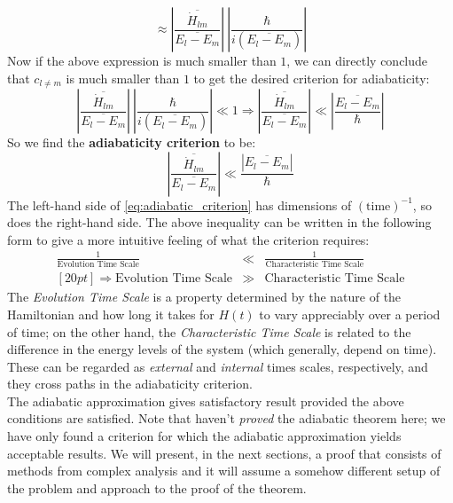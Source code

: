 \documentclass[12pt,a4paper]{article}
\begin{document}
	\begin{equation}
		\approx \left| \dfrac{\overline{\dot{H}_{lm}}}{\overline{E_{l} - E_{m}}} \right|\ \left| \frac{\hbar}{i \left( \overline{E_{l} - E_{m}} \right)} \right|
		\label{eq:final_bound}
	\end{equation}
	Now if the above expression is much smaller than $1$, we can directly conclude that $c_{l \neq m}$ is much smaller than $1$ to get the desired criterion for adiabaticity:
	\begin{equation}
		\left| \dfrac{\overline{\dot{H}_{lm}}}{\overline{E_{l} - E_{m}}} \right|\ \left| \frac{\hbar}{i \left( \overline{E_{l} - E_{m}} \right)} \right| \ll 1 \Rightarrow \left| \dfrac{\overline{\dot{H}_{lm}}}{\overline{E_{l} - E_{m}}} \right| \ll \left| \frac{ \overline{E_{l} - E_{m}}}{\hbar} \right|
		\label{eq:adiabatic_criterion_step}
	\end{equation}
	So we find the \textbf{adiabaticity criterion} to be:
	\begin{equation}
		\boxed{
			\left| \dfrac{\overline{\dot{H}_{lm}}}{\overline{E_{l} - E_{m}}} \right| \ll \frac{\left| \overline{E_{l} - E_{m}} \right|}{\hbar}
		}
		\label{eq:adiabatic_criterion}
	\end{equation}
	The left-hand side of \eqref{eq:adiabatic_criterion} has dimensions of $\left(\text{time}\right)^{-1}$, so does the right-hand side. The above inequality can be written in the following form to give a more intuitive feeling of what the criterion requires:
	\begin{eqnarray}
		\frac{1}{\text{Evolution Time Scale}} &\ll& \frac{1}{\text{Characteristic Time Scale}}\nonumber \\ [20pt]
		\Rightarrow \text{Evolution Time Scale} &\gg& \text{Characteristic Time Scale}
		\label{eq:time_scale_interpretation}
	\end{eqnarray}
	The \emph{Evolution Time Scale} is a property determined by the nature of the Hamiltonian and how long it takes for $H(t)$ to vary appreciably over a period of time; on the other hand, the \emph{Characteristic Time Scale} is related to the difference in the energy levels of the system (which generally, depend on time). These can be regarded as \emph{external} and \emph{internal} times scales, respectively, and they cross paths in the adiabaticity criterion.\\
	
	The adiabatic approximation gives satisfactory result provided the above conditions are satisfied. Note that haven't \emph{proved} the adiabatic theorem here; we have only found a criterion for which the adiabatic approximation yields acceptable results. We will present, in the next sections, a proof that consists of methods from complex analysis and it will assume a somehow different setup of the problem and approach to the proof of the theorem.
	
\end{document}
